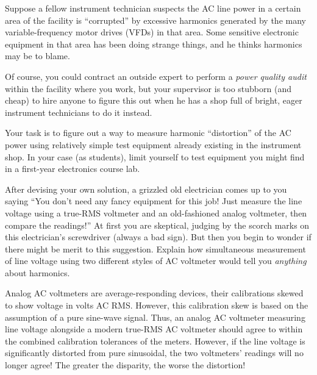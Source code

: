 

Suppose a fellow instrument technician suspects the AC line power in a certain area of the facility is ``corrupted'' by excessive harmonics generated by the many variable-frequency motor drives (VFDs) in that area.  Some sensitive electronic equipment in that area has been doing strange things, and he thinks harmonics may be to blame.

Of course, you could contract an outside expert to perform a {\it power quality audit} within the facility where you work, but your supervisor is too stubborn (and cheap) to hire anyone to figure this out when he has a shop full of bright, eager instrument technicians to do it instead.

\vskip 10pt

Your task is to figure out a way to measure harmonic ``distortion'' of the AC power using relatively simple test equipment already existing in the instrument shop.  In your case (as students), limit yourself to test equipment you might find in a first-year electronics course lab.

\vskip 10pt

After devising your own solution, a grizzled old electrician comes up to you saying ``You don't need any fancy equipment for this job!  Just measure the line voltage using a true-RMS voltmeter and an old-fashioned analog voltmeter, then compare the readings!''  At first you are skeptical, judging by the scorch marks on this electrician's screwdriver (always a bad sign).  But then you begin to wonder if there might be merit to this suggestion.  Explain how simultaneous measurement of line voltage using two different styles of AC voltmeter would tell you {\it anything} about harmonics.







Analog AC voltmeters are average-responding devices, their calibrations skewed to show voltage in volts AC RMS.  However, this calibration skew is based on the assumption of a pure sine-wave signal.  Thus, an analog AC voltmeter measuring line voltage alongside a modern true-RMS AC voltmeter should agree to within the combined calibration tolerances of the meters.  However, if the line voltage is significantly distorted from pure sinusoidal, the two voltmeters' readings will no longer agree!  The greater the disparity, the worse the distortion!










